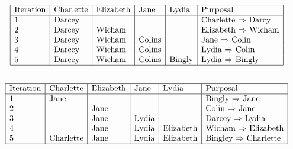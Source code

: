 \documentclass[letterpaper]{article}
\begin{document}
	\section{}
    	\subsection{}
        	\begin{displaymath}
            	\begin{array}{|l|l|l|l|l|l|}
                	\hline
					$Iteration$ & $Charlette$ & $Elizabeth$ & $Jane$ & $Lydia$ & $Purposal$\\
                    \hline
                    1 & $Darcey$ &&&& $Charlette $ \Rightarrow $ Darcy$\\
                    2 & $Darcey$ & $Wicham$ &&& $Elizabeth $ \Rightarrow $ Wicham$\\
                    3 & $Darcey$ & $Wicham$ & $Colins$ && $Jane $ \Rightarrow $ Colin$\\
                    4 & $Darcey$ & $Wicham$ & $Colins$ && $Lydia $ \Rightarrow $ Colin$\\
                    5 & $Darcey$ & $Wicham$ & $Colins$ & $Bingly$ & $Lydia $ \Rightarrow $ Bingly$\\
                    \hline
            	\end{array}
            \end{displaymath}
       \subsection{}
        	\begin{displaymath}
            	\begin{array}{|l|l|l|l|l|l|}
                	\hline
					$Iteration$ & $Charlette$ & $Elizabeth$ & $Jane$ & $Lydia$ & $Purposal$\\
                    \hline
                    1 & $Jane$ &&&& $Bingly $ \Rightarrow $ Jane$\\
                    2 && $Jane$ &&& $Colin $ \Rightarrow $ Jane$\\
                    3 && $Jane$ & $Lydia$ && $Darcey $ \Rightarrow $ Lydia$\\
                    4 && $Jane$ & $Lydia$ & $Elizabeth$ & $Wicham $ \Rightarrow $ Elizabeth$\\
                    5 & $Charlette$ & $Jane$ & $Lydia$ & $Elizabeth$ & $Bingley $ \Rightarrow $ Charlette$\\
                    \hline
            	\end{array}
            \end{displaymath}
\end{document}
